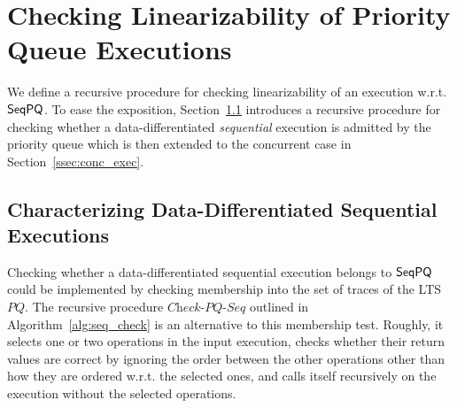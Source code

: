 \section{Checking Linearizability of Priority Queue Executions}
\label{sec:checking inclusion by recursive procedure}

We define a recursive procedure for checking linearizability of an execution w.r.t. $\mathsf{SeqPQ}$.
To ease the exposition, Section~\ref{ssec:seq_exec} introduces a recursive procedure for checking whether a data-differentiated \emph{sequential} execution is admitted by the priority queue which is then extended to the concurrent case in Section~\ref{ssec:conc_exec}.

\subsection{Characterizing Data-Differentiated Sequential Executions}\label{ssec:seq_exec}

Checking whether a data-differentiated sequential execution belongs to $\mathsf{SeqPQ}$ could be implemented by checking membership into the set of traces of the LTS $PQ$. The recursive procedure $\textit{Check-PQ-Seq}$ outlined in Algorithm~\ref{alg:seq_check} is an alternative to this membership test. Roughly, it selects one or two operations in the input execution, checks whether their return values are correct by ignoring the order between the other operations other than how they are ordered w.r.t. the selected ones, and calls itself recursively on the execution without the selected operations. %

